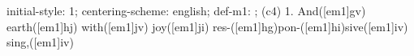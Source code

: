 initial-style: 1;
centering-scheme: english;
def-m1: \grealign;
(c4) 1. And([em1]gv) earth([em1]hj) with([em1]jv) joy([em1]ji) res-([em1]hg)pon-([em1]hi)sive([em1]iv) sing,([em1]iv)